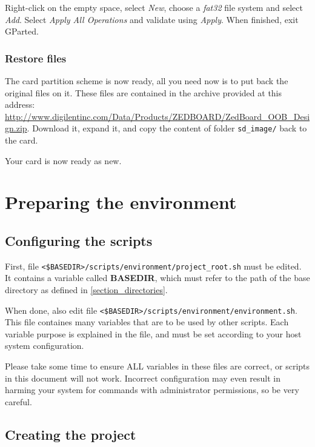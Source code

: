 \documentclass[openany,a4paper]{book}
\begin{document}
Right-click on the empty space, select \textit{New}, choose a \textit{fat32} file system and select \textit{Add}.
Select \textit{Apply All Operations} and validate using \textit{Apply}.
When finished, exit GParted.

\subsection{Restore files}

The card partition scheme is now ready, all you need now is to put back the original files on it.
These files are contained in the archive provided at this address: \url{http://www.digilentinc.com/Data/Products/ZEDBOARD/ZedBoard_OOB_Design.zip}.
Download it, expand it, and copy the content of folder \nolinkurl{sd_image/} back to the card.

Your card is now ready as new.


\chapter{Preparing the environment}\label{chapter_environment}

\section{Configuring the scripts}

First, file \nolinkurl{<$BASEDIR>/scripts/environment/project_root.sh} must be edited.
It contains a variable called \textbf{BASEDIR}, which must refer to the path of the base directory as defined in \ref{section_directories}.

When done, also edit file \nolinkurl{<$BASEDIR>/scripts/environment/environment.sh}.
This file containes many variables that are to be used by other scripts.
Each variable purpose is explained in the file, and must be set according to your host system configuration.

Please take some time to ensure ALL variables in these files are correct, or scripts in this document will not work.
Incorrect configuration may even result in harming your system for commands with administrator permissions, so be very careful.


\section{Creating the project}
\end{document}
